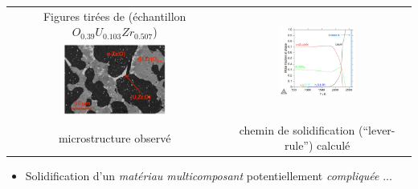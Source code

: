 \begin{frame}[fragile]
\begin{minipage}{0.8\textwidth}
\begin{tabular}{cc}
\tiny{Figures tirées de \cite{Quaini2015} (échantillon $O_{0.39}U_{0.103}Zr_{0.507}$}) & \multirow{2}{*}{\includegraphics[width=0.42\textwidth]{Figures/Fig18a_Quaini2015.png}} \\
\includegraphics[width=0.5\textwidth]{Figures/Fig18b_Quaini2015.png} & \\
\tiny{microstructure observé} & \tiny{chemin de solidification (``lever-rule'') calculé}
\end{tabular}
\end{minipage}
\begin{itemize}
\item Solidification d'un \emph{matériau multicomposant} potentiellement \emph{compliquée} ... 
\end{itemize}
\end{frame}
